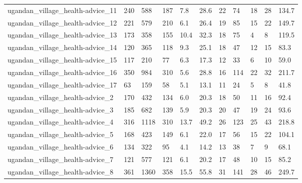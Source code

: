 \begin{longtable}{lllllllllll}
 ugandan\_village\_health-advice\_11                   & 240        & 588       & 187   & 7.8    & 28.6   & 22    & 74     & 18     & 28     & 134.7   \\
 ugandan\_village\_health-advice\_12                   & 221        & 579       & 210   & 6.1    & 26.4   & 19    & 85     & 15     & 22     & 149.7   \\
 ugandan\_village\_health-advice\_13                   & 173        & 358       & 155   & 10.4   & 32.3   & 18    & 75     & 4      & 8      & 119.5   \\
 ugandan\_village\_health-advice\_14                   & 120        & 365       & 118   & 9.3    & 25.1   & 18    & 47     & 12     & 15     & 83.3    \\
 ugandan\_village\_health-advice\_15                   & 117        & 210       & 77    & 6.3    & 17.3   & 12    & 33     & 6      & 10     & 59.0    \\
 ugandan\_village\_health-advice\_16                   & 350        & 984       & 310   & 5.6    & 28.8   & 16    & 114    & 22     & 32     & 211.7   \\
 ugandan\_village\_health-advice\_17                   & 63         & 159       & 58    & 5.1    & 13.1   & 11    & 24     & 5      & 8      & 41.8    \\
 ugandan\_village\_health-advice\_2                    & 170        & 432       & 134   & 6.0    & 20.3   & 18    & 50     & 11     & 16     & 92.4    \\
 ugandan\_village\_health-advice\_3                    & 185        & 682       & 139   & 5.9    & 20.3   & 20    & 47     & 19     & 24     & 93.6    \\
 ugandan\_village\_health-advice\_4                    & 316        & 1118      & 310   & 13.7   & 49.2   & 26    & 123    & 25     & 43     & 218.8   \\
 ugandan\_village\_health-advice\_5                    & 168        & 423       & 149   & 6.1    & 22.0   & 17    & 56     & 15     & 22     & 104.1   \\
 ugandan\_village\_health-advice\_6                    & 134        & 322       & 95    & 4.1    & 14.2   & 13    & 38     & 7      & 9      & 68.1    \\
 ugandan\_village\_health-advice\_7                    & 121        & 577       & 121   & 6.1    & 20.2   & 17    & 48     & 10     & 15     & 85.2    \\
 ugandan\_village\_health-advice\_8                    & 361        & 1360      & 358   & 15.5   & 55.8   & 31    & 141    & 28     & 46     & 249.7   \\

\end{longtable}
